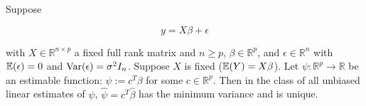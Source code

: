 \begin{theorem}

Suppose

\[
y = X \beta + \epsilon
\]

with \(X \in \mathbb{R}^{n \times p}\) a fixed full rank matrix and \(n \geq p\), \(\beta \in \mathbb{R}^p\), and \(\epsilon \in \mathbb{R}^n\) with \(\E (\epsilon )= 0\) and \(\Var( \epsilon) = \sigma^2 I_n\). Suppose \(X\) is fixed (\(\E (Y) = X \beta\)). Let \(\psi : \mathbb{R}^p \to \mathbb{R}\) be an estimable function: \(\psi := c^T \beta \) for some \(c \in \mathbb{R}^p\). Then in the class of all unbiased linear estimates of \(\psi\), \(\hat{\psi} = c^T \hat{\beta}\) has the minimum variance and is unique.

\end{theorem}

